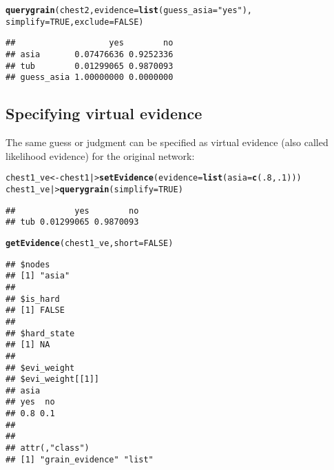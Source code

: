 \documentclass[10pt]{article}\usepackage[]{graphicx}\usepackage[]{xcolor}
\makeatletter
\newcommand{\hlnum}[1]{\textcolor[rgb]{0.686,0.059,0.569}{#1}}%
\newcommand{\hlstr}[1]{\textcolor[rgb]{0.192,0.494,0.8}{#1}}%
\newcommand{\hlstd}[1]{\textcolor[rgb]{0.345,0.345,0.345}{#1}}%
\newcommand{\hlkwb}[1]{\textcolor[rgb]{0.69,0.353,0.396}{#1}}%
\newcommand{\hlkwc}[1]{\textcolor[rgb]{0.333,0.667,0.333}{#1}}%
\newcommand{\hlkwd}[1]{\textcolor[rgb]{0.737,0.353,0.396}{\textbf{#1}}}%
\newenvironment{kframe}{%
 \def\at@end@of@kframe{}%
 \ifinner\ifhmode%
  \def\at@end@of@kframe{\end{minipage}}%
  \begin{minipage}{\columnwidth}%
 \fi\fi%
 \def\FrameCommand##1{\hskip\@totalleftmargin \hskip-\fboxsep
 \colorbox{shadecolor}{##1}\hskip-\fboxsep
     \hskip-\linewidth \hskip-\@totalleftmargin \hskip\columnwidth}%
 \MakeFramed {\advance\hsize-\width
   \@totalleftmargin\z@ \linewidth\hsize
   \@setminipage}}%
 {\par\unskip\endMakeFramed%
 \at@end@of@kframe}
\newenvironment{knitrout}{}{} %
\makeatother
\begin{document}
\begin{knitrout}
\color{fgcolor}\begin{kframe}
\begin{alltt}
\hlkwd{querygrain}\hlstd{(chest2,} \hlkwc{evidence}\hlstd{=}\hlkwd{list}\hlstd{(}\hlkwc{guess_asia}\hlstd{=}\hlstr{"yes"}\hlstd{),}
           \hlkwc{simplify}\hlstd{=}\hlnum{TRUE}\hlstd{,} \hlkwc{exclude} \hlstd{=} \hlnum{FALSE}\hlstd{)}
\end{alltt}
\begin{verbatim}
##                   yes        no
## asia       0.07476636 0.9252336
## tub        0.01299065 0.9870093
## guess_asia 1.00000000 0.0000000
\end{verbatim}
\end{kframe}
\end{knitrout}

\subsection{Specifying virtual evidence}
\label{sec:spec-virt-evid}

The same guess or judgment can be specified as virtual evidence
(also called likelihood evidence) for the original network:

\begin{knitrout}
\color{fgcolor}\begin{kframe}
\begin{alltt}
\hlstd{chest1_ve} \hlkwb{<-} \hlstd{chest1 |>} \hlkwd{setEvidence}\hlstd{(}\hlkwc{evidence}\hlstd{=}\hlkwd{list}\hlstd{(}\hlkwc{asia}\hlstd{=}\hlkwd{c}\hlstd{(}\hlnum{.8}\hlstd{,} \hlnum{.1}\hlstd{)))}
\hlstd{chest1_ve |>} \hlkwd{querygrain}\hlstd{(}\hlkwc{simplify} \hlstd{=} \hlnum{TRUE}\hlstd{)}
\end{alltt}
\begin{verbatim}
##            yes        no
## tub 0.01299065 0.9870093
\end{verbatim}
\begin{alltt}
\hlkwd{getEvidence}\hlstd{(chest1_ve,} \hlkwc{short}\hlstd{=}\hlnum{FALSE}\hlstd{)}
\end{alltt}
\begin{verbatim}
## $nodes
## [1] "asia"
## 
## $is_hard
## [1] FALSE
## 
## $hard_state
## [1] NA
## 
## $evi_weight
## $evi_weight[[1]]
## asia
## yes  no 
## 0.8 0.1 
## 
## 
## attr(,"class")
## [1] "grain_evidence" "list"
\end{verbatim}
\end{kframe}
\end{knitrout}
\end{document}
